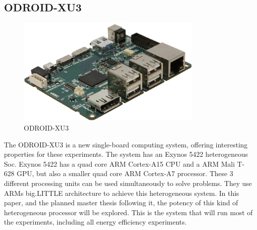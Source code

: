 \subsection{ODROID-XU3} \label{OdroidXU3}
\begin{figure}[H]
  \centering
  \includegraphics[width=90mm]{fig/ODROID.jpg}
  \caption{ODROID-XU3 \label{overflow}}
\end{figure}
The ODROID-XU3 is a new single-board computing system, offering interesting properties for these experiments.
The system has an Exynos 5422 heterogeneous Soc.
Exynos 5422 has a quad core ARM Cortex-A15 CPU and a ARM Mali T-628 GPU, but also a smaller quad core ARM Cortex-A7 processor.
These 3 different processing units can be used simultaneously to solve problems.
They use ARMs big.LITTLE architecture to achieve this heterogeneous system.
In this paper, and the planned master thesis following it, the potency of this kind of heterogeneous processor will be explored.
This is the system that will run most of the experiments, including all energy efficiency experiments.

